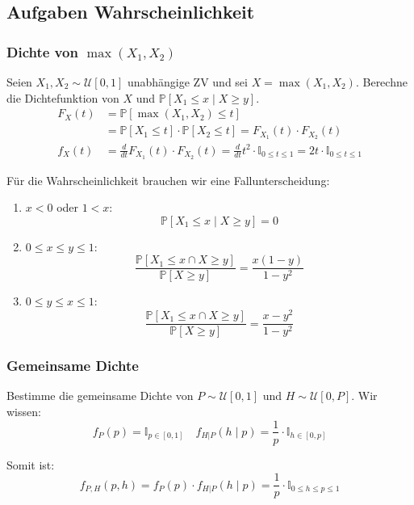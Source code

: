 \documentclass[a4paper,10pt]{article}
\def\P{\mathbb{P}}
\begin{document}
\subsection{Aufgaben Wahrscheinlichkeit}
\subsubsection*{\texorpdfstring{Dichte von \(\max(X_1,X_2)\)}{Dichte von max()}}

Seien \(X_1, X_2 \sim \mathcal{U}[0,1]\) unabhängige ZV und sei \(X = \max (X_1, X_2)\). Berechne die Dichtefunktion von \(X\) und \(\P[X_1 \leq x \mid X \geq y]\).
\begin{align*}
	F_X(t) & = \P[\max(X_1, X_2) \leq t]                                                                                                              \\ &= \P[X_1 \leq t] \cdot \P[X_2 \leq t] = F_{X_1}(t) \cdot F_{X_2}(t) \\
	f_X(t) & = \frac{d}{dt} F_{X_1}(t) \cdot F_{X_2}(t) = \frac{d}{dt} t^2 \cdot \mathbb{I}_{0 \leq t \leq 1} = 2t \cdot \mathbb{I}_{0 \leq t \leq 1}
\end{align*}

Für die Wahrscheinlichkeit brauchen wir eine Fallunterscheidung: \smallskip

\begin{enumerate}
	\item \(x < 0\) oder \(1 < x\):
	      \[\mathbb{P}[X_1 \leq x \mid X \geq y] = 0\]
	\item \(0 \leq x \leq y \leq 1\):
	      \[\frac{\mathbb{P}[X_1 \leq x \cap X \geq y]}{\mathbb{P}[X \geq y]} = \frac{x(1-y)}{1 - y^2}\]
	\item \(0 \leq y \leq x \leq 1\):
	      \[\frac{\mathbb{P}[X_1 \leq x \cap X \geq y]}{\mathbb{P}[X \geq y]} = \frac{x - y^2}{1 - y^2}\]
\end{enumerate}

\subsubsection*{Gemeinsame Dichte}

Bestimme die gemeinsame Dichte von \(P \sim \mathcal{U}[0,1]\) und \(H \sim \mathcal{U}[0,P]\). Wir wissen:
\[f_P(p) = \mathbb I_{p \in [0,1]} \quad f_{H | P}(h \mid p) = \frac{1}{p} \cdot \mathbb{I}_{h \in [0,p]}\]

\noindent
Somit ist:
\[f_{P, H} (p, h) = f_P(p) \cdot f_{H | P}(h \mid p) = \frac{1}{p} \cdot \mathbb I_{0 \leq h \leq p \leq 1}\]
\end{document}
